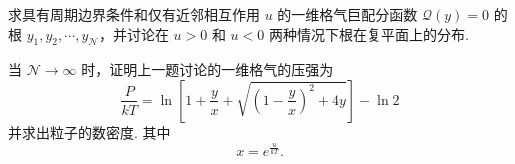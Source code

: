 \documentclass{assignment}
\begin{document}
\begin{prob}
    求具有周期边界条件和仅有近邻相互作用 $u$ 的一维格气巨配分函数 $\mathcal{Q}(y)=0$ 的根 $y_1,y_2,\cdots,y_{\mathcal{N}}$，并讨论在 $u>0$ 和 $u<0$ 两种情况下根在复平面上的分布.
\end{prob}
\begin{sol}
    
\end{sol}

\begin{prob}
    当 $\mathcal{N}\rightarrow\infty$ 时，证明上一题讨论的一维格气的压强为
    \[
        \frac{P}{kT}=\ln\left[1+\frac{y}{x}+\sqrt{\left(1-\frac{y}{x}\right)^2+4y}\right]-\ln 2
    \]
    并求出粒子的数密度. 其中
    \[
        x=e^{\frac{u}{kT}}.
    \]
\end{prob}
\begin{pf}
    
\end{pf}
\end{document}
